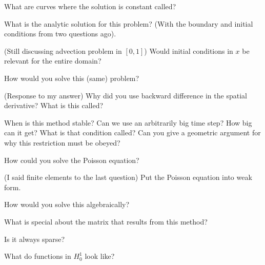\documentclass[12pt]{article}
\newenvironment{problem}[2][Problem]{\begin{trivlist}
\item[\hskip \labelsep {\bfseries #1}\hskip \labelsep {\bfseries #2.}]}{\end{trivlist}}
\begin{document}
\begin{problem}{}
What are curves where the solution is constant called?
\end{problem}

\begin{problem}{}
What is the analytic solution for this problem? (With the boundary and initial conditions from two questions ago).
\end{problem}

\begin{problem}{}
(Still discussing advection problem in $[0,1]$) Would initial conditions in $x$ be relevant for the entire domain?
\end{problem}

\begin{problem}{}
How would you solve this (same) problem?
\end{problem}

\begin{problem}{}
(Response to my answer) Why did you use backward difference in the spatial derivative?  What is this called?
\end{problem}

\begin{problem}{}
When is this method stable?  Can we use an arbitrarily big time step? How big can it get?  What is that condition called?  Can you give a geometric argument for why this restriction must be obeyed?
\end{problem}

\begin{problem}{}
How could you solve the Poisson equation?
\end{problem}

\begin{problem}{}
(I said finite elements to the last question)
Put the Poisson equation into weak form.
\end{problem}

\begin{problem}{}
How would you solve this algebraically?
\end{problem}

\begin{problem}{}
What is special about the matrix that results from this method?
\end{problem}

\begin{problem}{}
Is it always sparse?
\end{problem}

\begin{problem}{}
What do functions in $H_0^1$ look like?
\end{problem}
\end{document}
